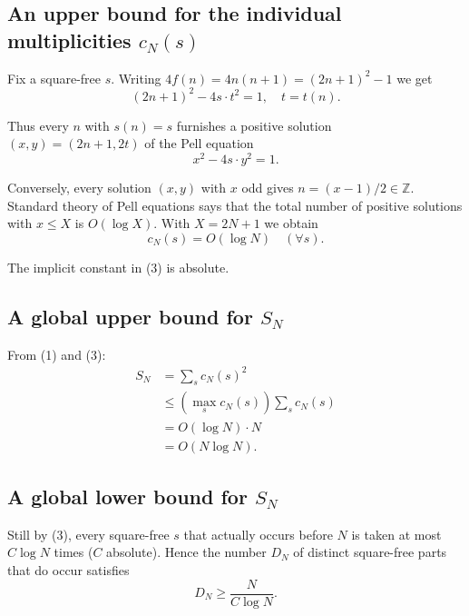 \documentclass[12pt,a4paper]{article}
\theoremstyle{definition}
\begin{document}
        \subsection*{An upper bound for the individual multiplicities $c_N(s)$}

        Fix a square-free $s$.
        Writing $4f(n) = 4n(n+1) = (2n+1)^2 - 1$ we get
        \[(2n+1)^2 - 4s \cdot t^2 = 1, \quad t = t(n).\]

        Thus every $n$ with $s(n) = s$ furnishes a positive solution $(x,y) = (2n+1, 2t)$
        of the Pell equation
        \begin{equation}
            x^2 - 4s \cdot y^2 = 1.
        \end{equation}

        Conversely, every solution $(x,y)$ with $x$ odd gives $n = (x-1)/2 \in \mathbb{Z}$.
        Standard theory of Pell equations says that the total number of
        positive solutions with $x \leq X$ is $O(\log X)$. With $X = 2N+1$ we obtain
        \begin{equation}
            c_N(s) = O(\log N) \quad (\forall s).
        \end{equation}

        The implicit constant in (3) is absolute.

        \subsection*{A global upper bound for $S_N$}

        From (1) and (3):
        \begin{align}
            S_N &= \sum_s c_N(s)^2 \\
            &\leq \left(\max_s c_N(s)\right) \sum_s c_N(s) \\
            &= O(\log N) \cdot N \\
            &= O(N \log N).
        \end{align}

        \subsection*{A global lower bound for $S_N$}

        Still by (3), every square-free $s$ that actually occurs before $N$ is
        taken at most $C \log N$ times ($C$ absolute). Hence the number
        $D_N$ of distinct square-free parts that do occur satisfies
        \begin{equation}
            D_N \geq \frac{N}{C \log N}.
        \end{equation}
\end{document}

